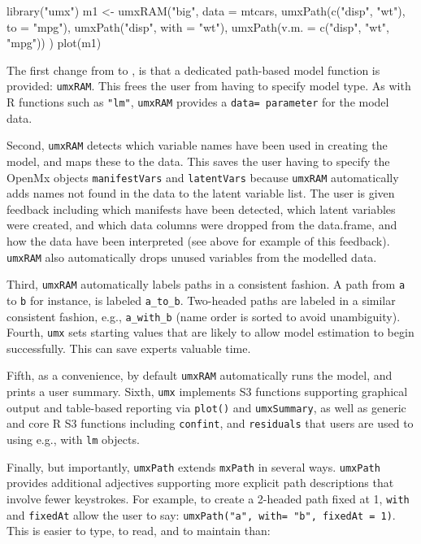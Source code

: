 \documentclass{article}
\newcommand{\code}[1]{\texttt{#1}}
\begin{document}
\begin{CodeInput}
library("umx")
m1 <- umxRAM("big", data = mtcars,
  umxPath(c("disp", "wt"), to = "mpg"),
  umxPath("disp", with = "wt"),
  umxPath(v.m. = c("disp", "wt", "mpg"))
)
plot(m1)
\end{CodeInput}

The first change from  to , is that a dedicated path-based model function is provided: \code{umxRAM}. This frees the user from having to specify model type. As with R functions such as \code{"lm"}, \code{umxRAM} provides a \code{data= parameter} for the model data. 

Second, \code{umxRAM} detects which variable names have been used in creating the model, and maps these to the data. This saves the user having to specify the OpenMx objects \code{manifestVars} and \code{latentVars} because \code{umxRAM} automatically adds names not found in the data to the latent variable list. The user is given feedback including which manifests have been detected, which latent variables were created, and which data columns were dropped from the data.frame, and how the data have been interpreted (see above for example of this feedback). \code{umxRAM} also automatically drops unused variables from the modelled data.

Third, \code{umxRAM} automatically labels paths in a consistent fashion. A path from \code{a} to \code{b} for instance, is labeled \code{a\_to\_b}. Two-headed paths are labeled in a similar consistent fashion, e.g., \code{a\_with\_b} (name order is sorted to avoid unambiguity). Fourth, \code{umx} sets starting values that are likely to allow model estimation to begin successfully. This can save experts valuable time.

Fifth, as a convenience, by default \code{umxRAM} automatically runs the model, and prints a user summary. Sixth, \code{umx} implements S3 functions supporting graphical output and table-based reporting via \code{plot()} and \code{umxSummary}, as well as generic and core R S3 functions including \code{confint}, and \code{residuals} that users are used to using e.g., with \code{lm} objects.

Finally, but importantly, \code{umxPath} extends \code{mxPath} in several ways. \code{umxPath} provides additional adjectives supporting more explicit path descriptions that involve fewer keystrokes. For example, to create a 2-headed path fixed at 1, \code{with} and \code{fixedAt} allow the user to say: \code{umxPath("a", with= "b", fixedAt = 1)}. This is easier to type, to read, and to maintain than:
\end{document}
